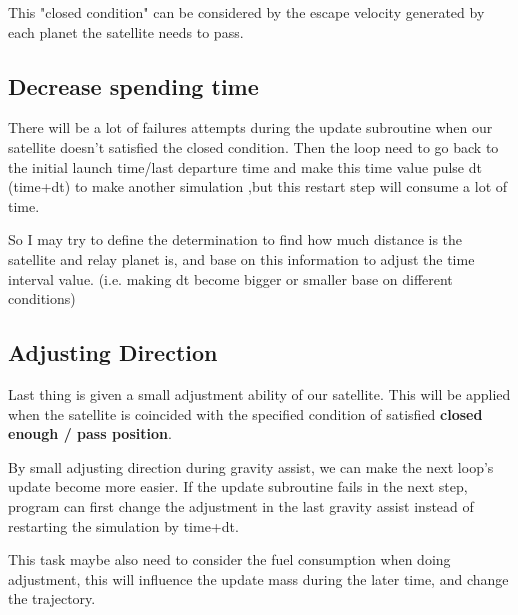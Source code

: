 \documentclass{article}
\begin{document}
\begin{multicols}{2}
This "closed condition" can be considered by the escape velocity generated by each planet the satellite needs to pass.


\subsection{Decrease spending time}
There will be a lot of failures attempts during the update subroutine when our satellite doesn't satisfied the closed condition. Then the loop need to go back to the initial launch time/last departure time and make this time value pulse dt (time+dt) to make another simulation ,but this restart step will consume a lot of time. 

So I may try to define the determination to find how much distance is the satellite and relay planet is, and base on this information to adjust the time interval value. (i.e. making dt become bigger or smaller base on different conditions)


\subsection{Adjusting Direction}
Last thing is given a small adjustment ability of our satellite.
This will be applied when the satellite is coincided with the specified condition of satisfied \textbf{closed enough / pass position}.

By small adjusting direction during gravity assist, we can make the next loop's update become more easier. If the update subroutine fails in the next step, program can first change the adjustment in the last gravity assist instead of restarting the simulation by time+dt.

This task maybe also need to consider the fuel consumption when doing adjustment,
this will influence the update mass during the later time, and change the trajectory.


\end{multicols}
\end{document}
